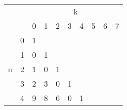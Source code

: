 \begin{table}[H]
\centering
\begin{tabular}{|ll|llllllll|} 
\hline
                   &   & \multicolumn{8}{c|}{k}                                                                                                                                                                                                                                                                                                            \\
                   &   & 0                                        & 1                                     & 2                                     & 3                                     & 4                                     & 5                                     & 6                                     & 7                                      \\ 
\hline
\multirow{8}{*}{n} & 0 & {\cellcolor[rgb]{0.878,0.106,0.141}}1    &                                       &                                       &                                       &                                       &                                       &                                       &                                        \\
                   & 1 & {\cellcolor[rgb]{0.2,0.82,0.478}}0       & {\cellcolor[rgb]{0.878,0.106,0.141}}1 &                                       &                                       &                                       &                                       &                                       &                                        \\
                   & 2 & {\cellcolor[rgb]{0.208,0.518,0.894}}1    & {\cellcolor[rgb]{0.2,0.82,0.478}}0    & {\cellcolor[rgb]{0.878,0.106,0.141}}1 &                                       &                                       &                                       &                                       &                                        \\
                   & 3 & {\cellcolor[rgb]{0.208,0.518,0.894}}2    & 3                                     & {\cellcolor[rgb]{0.2,0.82,0.478}}0    & {\cellcolor[rgb]{0.878,0.106,0.141}}1 &                                       &                                       &                                       &                                        \\
                   & 4 & {\cellcolor[rgb]{0.208,0.518,0.894}}9    & 8                                     & 6                                     & {\cellcolor[rgb]{0.2,0.82,0.478}}0    & {\cellcolor[rgb]{0.878,0.106,0.141}}1 &                                       &                                       &                                        \\

\end{tabular}
\end{table}
